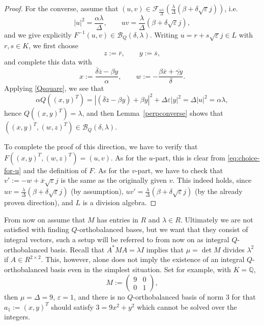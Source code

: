 \documentclass[11pt]{amsart}
\newcommand{\QQ}{\mathbb{Q}}
\theoremstyle{definition}
\theoremstyle{remark}
\begin{document}
\begin{proof}
For the converse, assume that $(u,v)\in \mathcal{F}_{\frac{\alpha\lambda}{\Delta}}\left(\frac{\lambda}{\Delta}(\beta+\delta\sqrt{\varepsilon}j)\right)$, i.e.
\[
|u|^2=\frac{\alpha\lambda}{\Delta},\qquad uv=\frac{\lambda}{\Delta}(\beta+\delta\sqrt{\varepsilon}j),
\]
and we give explicitly $F^{-1}(u,v)\in\mathcal B_Q(\delta,\lambda)$. Writing $u=r+s\sqrt{\varepsilon} j\in L$ with $r,s\in K$, we first choose
\begin{equation}\label{eq:choice-for-u}
z:= \overline{r},\qquad y:=\overline{s},
\end{equation}
and complete this data with
\[
x:=\frac{\overline{\delta}\overline{z}-\beta y}{\alpha},\qquad w:= - \frac{\beta\overline{x}+\overline{\gamma y}}{\delta}.
\]
Applying \eqref{Qsquare}, we see that
\[\alpha Q((x,y)^T)=|(\overline\delta\overline z-\beta y)+\beta y|^2+\Delta\varepsilon|y|^2=\Delta |u|^2=\alpha\lambda,\]
hence $Q((x,y)^T)=\lambda$, and then Lemma~\ref{perpconverse} shows that $((x,y)^T,(w,z)^T)\in\mathcal B_Q(\delta,\lambda)$.

To complete the proof of this direction, we have to verify that $F((x,y)^T,(w,z)^T)=(u,v)$. As for the $u$-part, this is clear from \eqref{eq:choice-for-u} and the definition of $F$. As for the $v$-part, we have to check that $v':=-w+\overline{x}\sqrt{\varepsilon}j$ is the same as the originally given $v$. This indeed holds, since $uv=\frac{\lambda}{\Delta}(\beta+\delta\sqrt{\varepsilon}j)$ (by assumption), $uv'=\frac{\lambda}{\Delta}(\beta+\delta\sqrt{\varepsilon}j)$ (by the already proven direction), and $L$ is a division algebra.
\end{proof}

From now on assume that $M$ has entries in $R$ and $\lambda\in R$. Ultimately we are not satisfied with finding $Q$-orthobalanced bases, but we want that they consist
of integral vectors, such a setup will be referred to from now on as integral $Q$-orthobalanced basis. Recall that $A^*MA=\lambda I$ implies that $\mu=\det M$ divides
$\lambda^2$ if $A\in R^{2\times 2}$. This, however, alone does not imply the existence of an integral $Q$-orthobalanced basis even in the simplest situation. Set for example, with $K=\QQ$,
\[
M:=\begin{pmatrix}
9 & 0 \\ 0& 1    
\end{pmatrix},
\]
then $\mu=\Delta=9$, $\varepsilon=1$, and there is no $Q$-orthobalanced basis of norm $3$ for that $a_1:=(x,y)^T$ should satisfy $3=9x^2+y^2$ which cannot be solved over the integers.
\end{document}

